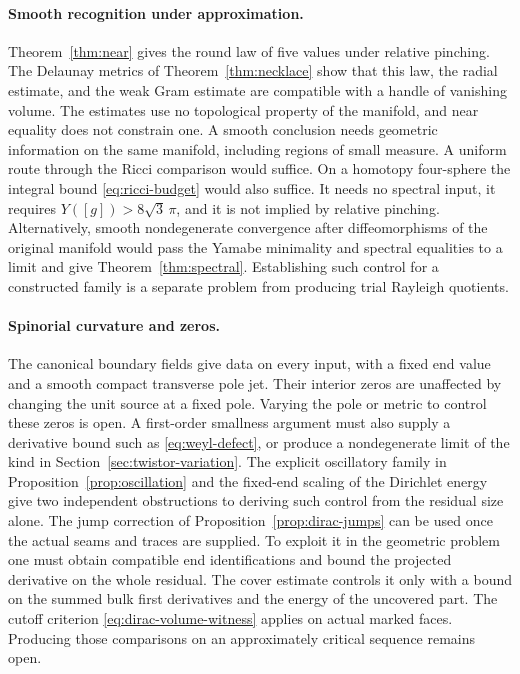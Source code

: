 \documentclass[11pt]{article}
\numberwithin{equation}{section}
\newcommand{\Y}{Y([g])}
\begin{document}
\paragraph{Smooth recognition under approximation.}
Theorem~\ref{thm:near} gives the round law of five values under
relative pinching. The Delaunay metrics of
Theorem~\ref{thm:necklace} show that this law, the radial estimate,
and the weak Gram estimate are compatible with a handle of vanishing
volume. The estimates use no topological property of the manifold,
and near equality does not constrain one. A smooth conclusion needs
geometric information on the same manifold, including regions of small
measure. A uniform route through the Ricci comparison would suffice.
On a homotopy four-sphere the integral bound \eqref{eq:ricci-budget}
would also suffice. It needs no spectral input, it requires
\(\Y>8\sqrt3\,\pi\), and it is not implied by relative pinching.
Alternatively, smooth nondegenerate convergence after
diffeomorphisms of the original manifold would pass the Yamabe
minimality and spectral equalities to a limit and give
Theorem~\ref{thm:spectral}. Establishing such control for a
constructed family is a separate problem from producing trial
Rayleigh quotients.

\paragraph{Spinorial curvature and zeros.}
The canonical boundary fields give data on every input,
with a fixed end value and a smooth compact transverse pole jet.
Their interior zeros are unaffected by changing the unit source at
a fixed pole. Varying the pole or metric to control these zeros is
open. A first-order smallness argument must also supply
a derivative bound such as \eqref{eq:weyl-defect}, or produce a
nondegenerate limit of the kind in
Section~\ref{sec:twistor-variation}. The explicit oscillatory
family in Proposition~\ref{prop:oscillation} and the fixed-end
scaling of the Dirichlet energy give two independent obstructions
to deriving such control from the residual size alone. The
jump correction of Proposition~\ref{prop:dirac-jumps} can be used
once the actual seams and traces are supplied. To exploit it in the
geometric problem one must obtain compatible end identifications
and bound the projected derivative on the whole residual. The cover
estimate controls it only with a bound on the summed bulk first
derivatives and the energy of the uncovered part. The cutoff
criterion \eqref{eq:dirac-volume-witness} applies on actual marked
faces. Producing those comparisons on an approximately critical
sequence remains open.
\end{document}
